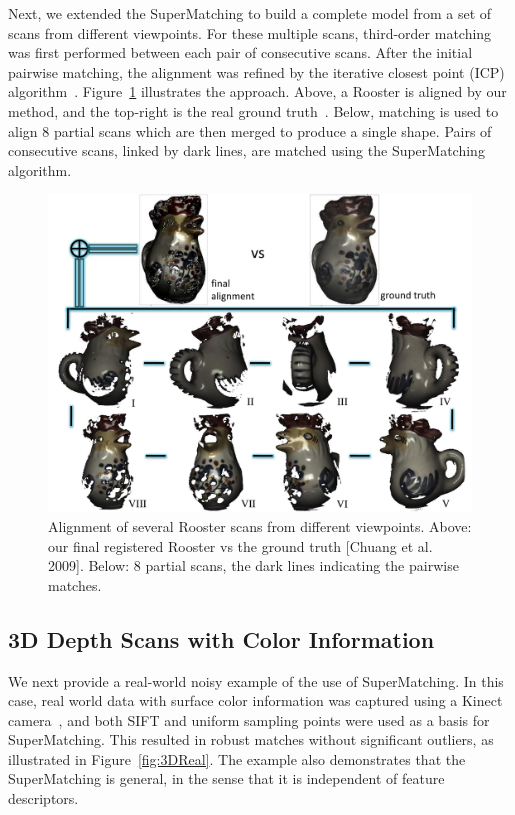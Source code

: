 Next, we extended the SuperMatching to build a complete model from a set of scans from different viewpoints.
For these multiple scans,  third-order matching was first performed between each pair of consecutive scans.
After the initial pairwise matching, the alignment was refined by the iterative closest point (ICP) algorithm~\cite{Besl92}.
Figure~\ref{fig:3DRigid} illustrates the approach.
Above, a Rooster is aligned by our method, and the top-right is the real ground truth~\cite{Chuang09}.
Below, matching is used to align 8 partial scans which are then merged to produce a single shape.
Pairs of consecutive scans, linked by dark lines, are matched using the SuperMatching algorithm.

\begin{figure}[htb]
\centering
  \includegraphics[width=0.99\linewidth]{figures/Rooster.pdf}
  \caption{Alignment of several Rooster scans from different viewpoints.
  Above: our final registered Rooster vs the ground truth [Chuang et al. 2009]. Below: 8 partial scans, the dark lines indicating the pairwise matches.}
\label{fig:3DRigid}
\end{figure}


\subsection{3D Depth Scans with Color Information}
\label{subsec:3dColored}

We next provide a real-world noisy example of the use of SuperMatching.
In this case, real world data with surface color information was captured using a Kinect camera~\cite{Kinect12},
and both SIFT and uniform sampling points were used as a basis for SuperMatching.
This resulted in robust matches without significant outliers, as illustrated in Figure~\ref{fig:3DReal}.
The example also demonstrates that the SuperMatching is general, in the sense that it is independent of feature descriptors.

